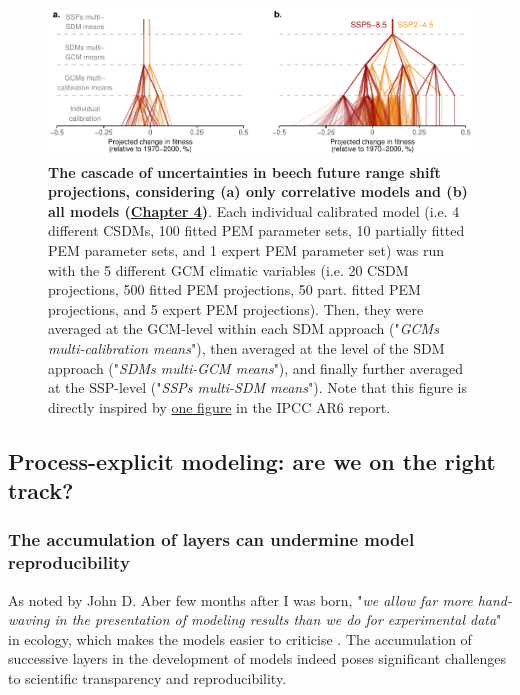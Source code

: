 \begin{figure}[H]
\centering
\includegraphics{discussion/figs/cascade_bonus.pdf}
\caption{\textbf{The cascade of uncertainties in beech future range shift projections, considering (a) only correlative models and (b) all models (\hyperref[chapter4]{Chapter 4})}. Each individual calibrated model (i.e. 4 different CSDMs, 100 fitted PEM parameter sets, 10 partially fitted PEM parameter sets, and 1 expert PEM parameter set) was run with the 5 different GCM climatic variables (i.e. 20 CSDM projections, 500 fitted PEM projections, 50 part. fitted PEM projections, and 5 expert PEM projections). Then, they were averaged at the GCM-level within each SDM approach ("\emph{GCMs multi-calibration means}"), then averaged at the level of the SDM approach ("\emph{SDMs multi-GCM means}"), and finally further averaged at the SSP-level ("\emph{SSPs multi-SDM means}"). Note that this figure is directly inspired by \href{https://www.ipcc.ch/report/ar6/wg1/figures/chapter-1/figure-1-15}{one figure} in the IPCC AR6 report.}
\label{fig:cascadebonus}
\end{figure}


\subsection{Process-explicit modeling: are we on the right track?}

\subsubsection{The accumulation of layers can undermine model reproducibility}

As noted by John D. Aber few months after I was born, "\emph{we allow far more hand-waving in the presentation of modeling results than we do for experimental data}" in ecology, which makes the models easier to criticise \citep{Aber1997}. The accumulation of successive layers in the development of models indeed poses significant challenges to scientific transparency and reproducibility. 

